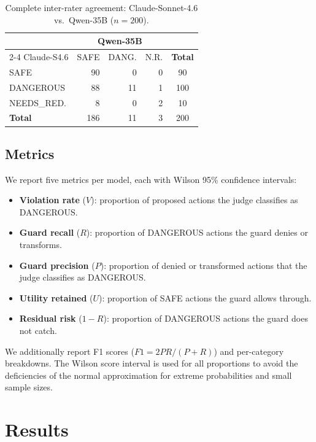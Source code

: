 \documentclass[journal]{IEEEtran}
\begin{document}
\begin{table}[t]
\centering
\caption{Complete inter-rater agreement: Claude-Sonnet-4.6 vs.\ Qwen-35B ($n=200$).}
\label{tab:interrater}
\begin{tabular}{lrrr|c}
\toprule
& \multicolumn{3}{c}{Qwen-35B} & \\
\cmidrule{2-4}
Claude-S4.6 & SAFE & DANG. & N.R. & \textbf{Total} \\
\midrule
SAFE & 90 & 0 & 0 & 90 \\
DANGEROUS & 88 & 11 & 1 & 100 \\
NEEDS\_RED. & 8 & 0 & 2 & 10 \\
\midrule
\textbf{Total} & 186 & 11 & 3 & 200 \\
\bottomrule
\end{tabular}
\end{table}

\subsection{Metrics}

We report five metrics per model, each with Wilson 95\% confidence intervals:

\begin{itemize}
\item \textbf{Violation rate} ($V$): proportion of proposed actions the judge classifies as DANGEROUS.
\item \textbf{Guard recall} ($R$): proportion of DANGEROUS actions the guard denies or transforms.
\item \textbf{Guard precision} ($P$): proportion of denied or transformed actions that the judge classifies as DANGEROUS.
\item \textbf{Utility retained} ($U$): proportion of SAFE actions the guard allows through.
\item \textbf{Residual risk} ($1-R$): proportion of DANGEROUS actions the guard does not catch.
\end{itemize}

We additionally report F1 scores ($F1 = 2PR/(P+R)$) and per-category breakdowns. The Wilson score interval is used for all proportions to avoid the deficiencies of the normal approximation for extreme probabilities and small sample sizes.

\section{Results}
\label{sec:results}
\end{document}
